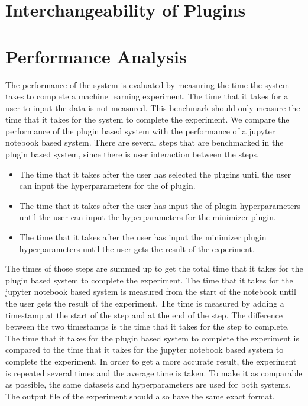 \documentclass[
  a4paper,  %
  twoside,  %
  bibliography=totoc,
  headsepline,
  cleardoublepage=empty,
  parskip=half,
  draft=false
]{scrbook}
\begin{document}
\section{Interchangeability of Plugins}
\label{sec:interchangeabilityOfPlugins}
\section{Performance Analysis}
\label{sec:performanceAnalysis}

The performance of the system is evaluated by measuring the time the system takes to complete a machine learning experiment.
The time that it takes for a user to input the data is not measured.
This benchmark should only measure the time that it takes for the system to complete the experiment.
We compare the performance of the plugin based system with the performance of a jupyter notebook based system.
There are several steps that are benchmarked in the plugin based system, since there is user interaction between the steps.
\begin{itemize}
  \item The time that it takes after the user has selected the plugins until the user can input the hyperparameters for the of plugin.
  \item The time that it takes after the user has input the of plugin hyperparameters until the user can input the hyperparameters for the minimizer plugin.
  \item The time that it takes after the user has input the minimizer plugin hyperparameters until the user gets the result of the experiment.
\end{itemize}
The times of those steps are summed up to get the total time that it takes for the plugin based system to complete the experiment.
The time that it takes for the jupyter notebook based system is measured from the start of the notebook until the user gets the result of the experiment.
The time is measured by adding a timestamp at the start of the step and at the end of the step.
The difference between the two timestamps is the time that it takes for the step to complete.
The time that it takes for the plugin based system to complete the experiment is compared to the time that it takes for the jupyter notebook based system to complete the experiment.
In order to get a more accurate result, the experiment is repeated several times and the average time is taken.
To make it as comparable as possible, the same datasets and hyperparameters are used for both systems.
The output file of the experiment should also have the same exact format.
\end{document}
